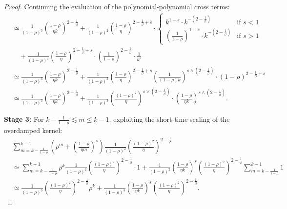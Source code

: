 \begin{proof}
Continuing the evaluation of the polynomial-polynomial cross terms:
\begin{align*}
    &\simeq \frac{1}{(1-\rho)^3} \left(\frac{1-\rho}{\eta k}\right)^{2-\frac{1}{\beta}} + \frac{1}{(1-\rho)^2} \left(\frac{1-\rho}{\eta}\right)^{2-\frac{1}{\beta}+s} \cdot \begin{cases} k^{1-s} \cdot k^{-(2-\frac{1}{\beta})} & \text{if } s < 1 \\ \left(\frac{1}{1-\rho}\right)^{1-s} \cdot k^{-(2-\frac{1}{\beta})} & \text{if } s > 1 \end{cases} \\
    &\quad + \frac{1}{(1-\rho)^2} \left(\frac{1-\rho}{\eta}\right)^{2-\frac{1}{\beta}+s} \cdot \left(\frac{1}{1-\rho}\right)^{2-\frac{1}{\beta}} \cdot \frac{1}{k^s} \\
    &\simeq \frac{1}{(1-\rho)^3} \left(\frac{1-\rho}{\eta k}\right)^{2-\frac{1}{\beta}} + \frac{1}{(1-\rho)^3} \left(\frac{1-\rho}{\eta}\right)^{2-\frac{1}{\beta}+s} \left(\frac{1}{(1-\rho) k }\right)^{s \wedge (2-\frac{1}{\beta})} \cdot \left(1-\rho\right)^{2-\frac{1}{\beta}+s} \\
    &\simeq \frac{1}{(1-\rho)^3} \left(\frac{1-\rho}{\eta k}\right)^{2-\frac{1}{\beta}} + \frac{1}{(1-\rho)^3} \left(\frac{(1-\rho)^2}{\eta}\right)^{s \vee (2-\frac{1}{\beta})} \cdot \left(\frac{1-\rho}{\eta k}\right)^{s \wedge (2-\frac{1}{\beta})}.
\end{align*}

\textbf{Stage 3:} For $k - \frac{1}{1-\rho} \lesssim m \le k-1$, exploiting the short-time scaling of the overdamped kernel:
\begin{align*}
    &\sum_{m=k-\frac{1}{1-\rho}}^{k-1} \left(\rho^m + \left(\frac{1-\rho}{\eta m}\right)^s\right) \frac{1}{(1-\rho)^2} \left(\frac{(1-\rho)^2}{\eta}\right)^{2-\frac{1}{\beta}} \\
    &\simeq \sum_{m=k-\frac{1}{1-\rho}}^{k-1} \rho^k \frac{1}{(1-\rho)^2} \left(\frac{(1-\rho)^2}{\eta}\right)^{2-\frac{1}{\beta}} \cdot 1 + \frac{1}{(1-\rho)^2} \left(\frac{1-\rho}{\eta k}\right)^s \left(\frac{(1-\rho)^2}{\eta}\right)^{2-\frac{1}{\beta}} \sum_{m=k-\frac{1}{1-\rho}}^{k-1} 1 \\
    &\simeq \frac{1}{(1-\rho)^3} \left(\frac{(1-\rho)^2}{\eta}\right)^{2-\frac{1}{\beta}} \rho^k + \frac{1}{(1-\rho)^3} \left(\frac{1-\rho}{\eta k}\right)^s \left(\frac{(1-\rho)^2}{\eta}\right)^{2-\frac{1}{\beta}}.
\end{align*}


\end{proof}
